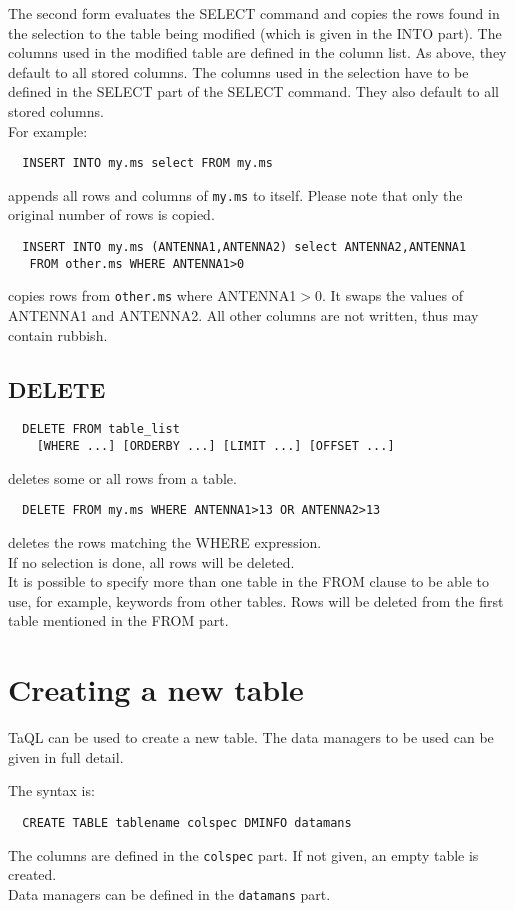 The second form evaluates the SELECT command and copies the rows
found in the selection to the table being modified (which is given
in the INTO part).
The columns used in the modified table are defined in the column list.
As above, they default to all stored columns. The columns used in the
selection have to be defined in the SELECT part of the SELECT command.
They also default to all stored columns.
\\For example:
\begin{verbatim}
  INSERT INTO my.ms select FROM my.ms
\end{verbatim}
appends all rows and columns of \texttt{my.ms} to itself.
Please note that only the original number of rows is copied.
\begin{verbatim}
  INSERT INTO my.ms (ANTENNA1,ANTENNA2) select ANTENNA2,ANTENNA1
   FROM other.ms WHERE ANTENNA1>0
\end{verbatim}
copies rows from \texttt{other.ms} where ANTENNA1$>$0. It swaps the
values of ANTENNA1 and ANTENNA2. All other columns are not written,
thus may contain rubbish.

\subsection{DELETE}
\begin{verbatim}
  DELETE FROM table_list
    [WHERE ...] [ORDERBY ...] [LIMIT ...] [OFFSET ...]
\end{verbatim}
deletes some or all rows from a table.
\begin{verbatim}
  DELETE FROM my.ms WHERE ANTENNA1>13 OR ANTENNA2>13
\end{verbatim}
deletes the rows matching the WHERE expression.
\\If no selection is done, all rows will be deleted.
\\It is possible to specify more than one table in the FROM clause to
be able to use, for example, keywords from other tables.
Rows will be deleted from the first table mentioned in the FROM part.

\section{\label{TAQL:CREATETABLE}Creating a new table}
TaQL can be used to create a new table. The data managers to be used
can be given in full detail.

The syntax is:
\begin{verbatim}
  CREATE TABLE tablename colspec DMINFO datamans
\end{verbatim}
The columns are defined in the \texttt{colspec} part. If not given, an
empty table is created.
\\Data managers can be defined in the \texttt{datamans} part.

